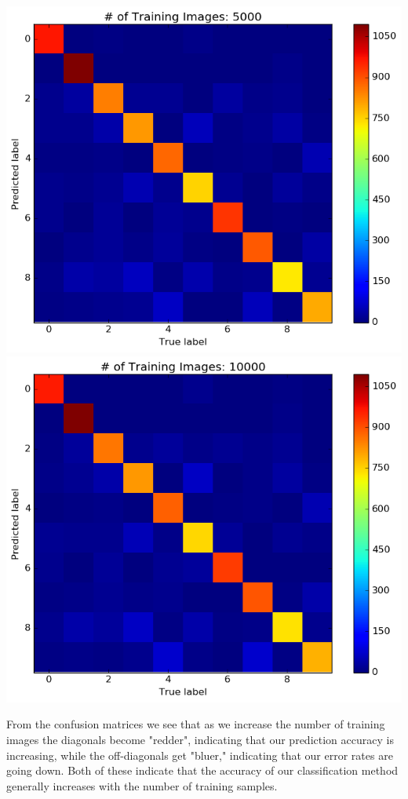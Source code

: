 \documentclass{article}
\begin{document}
\begin{center}
  \includegraphics[scale=0.4]{5000}\\
  \includegraphics[scale=0.4]{10000}
\end{center}

From the confusion matrices we see that as we increase the number of training images the diagonals become "redder", indicating that our prediction accuracy is increasing, while the off-diagonals get "bluer," indicating that our error rates are going down. Both of these indicate that the accuracy of our classification method generally increases with the number of training samples.
\end{document}
